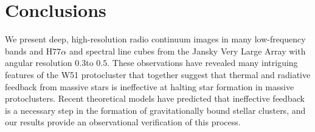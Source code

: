 \section{Conclusions}
\label{sec:conclusion}
We present deep, high-resolution radio continuum images in many low-frequency
bands and H$77\alpha$ and \ortho \twotwo spectral line cubes  from the Jansky
Very Large Array with angular resolution $0.3$\arcsec to $0.5$\arcsec.   These
observations have revealed many intriguing features of the W51 protocluster
that together suggest that thermal and radiative feedback from massive stars is
ineffective at halting star formation in massive protoclusters.
Recent theoretical models have predicted that ineffective feedback is a
necessary step in the formation of gravitationally bound stellar clusters, and
our results provide an observational verification of this process.

